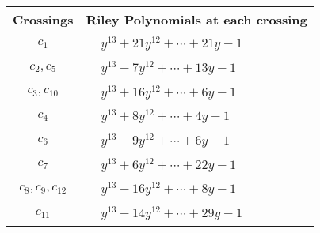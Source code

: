 \documentclass[1p]{elsarticle_modified}
\theoremstyle{definition}
\begin{document}
\begin{tabular}{m{50pt}|m{274pt}}
Crossings & \hspace{64pt}Riley Polynomials at each crossing \\
\hline $$\begin{aligned}c_{1}\end{aligned}$$&$\begin{aligned}
&y^{13}+21 y^{12}+\cdots+21 y-1
\end{aligned}$\\
\hline $$\begin{aligned}c_{2},c_{5}\end{aligned}$$&$\begin{aligned}
&y^{13}-7 y^{12}+\cdots+13 y-1
\end{aligned}$\\
\hline $$\begin{aligned}c_{3},c_{10}\end{aligned}$$&$\begin{aligned}
&y^{13}+16 y^{12}+\cdots+6 y-1
\end{aligned}$\\
\hline $$\begin{aligned}c_{4}\end{aligned}$$&$\begin{aligned}
&y^{13}+8 y^{12}+\cdots+4 y-1
\end{aligned}$\\
\hline $$\begin{aligned}c_{6}\end{aligned}$$&$\begin{aligned}
&y^{13}-9 y^{12}+\cdots+6 y-1
\end{aligned}$\\
\hline $$\begin{aligned}c_{7}\end{aligned}$$&$\begin{aligned}
&y^{13}+6 y^{12}+\cdots+22 y-1
\end{aligned}$\\
\hline $$\begin{aligned}c_{8},c_{9},c_{12}\end{aligned}$$&$\begin{aligned}
&y^{13}-16 y^{12}+\cdots+8 y-1
\end{aligned}$\\
\hline $$\begin{aligned}c_{11}\end{aligned}$$&$\begin{aligned}
&y^{13}-14 y^{12}+\cdots+29 y-1
\end{aligned}$\\
\hline
\end{tabular}\\~\\
\end{document}

